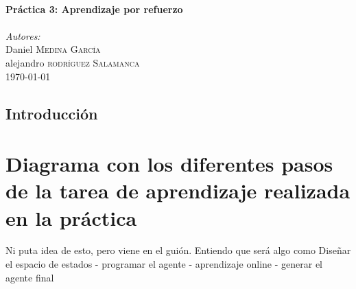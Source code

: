 \documentclass[12pt]{article}
\begin{document}
\begin{titlepage}
\HRule \\[0.7cm]
{ \huge \bfseries Práctica 3: Aprendizaje por refuerzo}\\[0.4cm] %
\HRule \\[0.7cm]


\textit{Autores:}\\
Daniel \textsc{Medina García}\\ %
alejandro \textsc{rodríguez Salamanca}\\[1.1cm] %


{\large \today}\\ %


\vfill %

\end{titlepage}

\tableofcontents

\newpage
\thispagestyle{empty}
\clearpage
\vspace*{\fill}
\begin{center}
    \begin{minipage}{\textwidth}
        \begin{center}
            \section*{Introducción}
        \end{center}
    \end{minipage}
\end{center}
\vfill

\newpage

\section{Diagrama con los diferentes pasos de la tarea de aprendizaje realizada en la práctica}
Ni puta idea de esto, pero viene en el guión. Entiendo que será algo como
Diseñar el espacio de estados - programar el agente - aprendizaje online - generar el agente final
\end{document}
